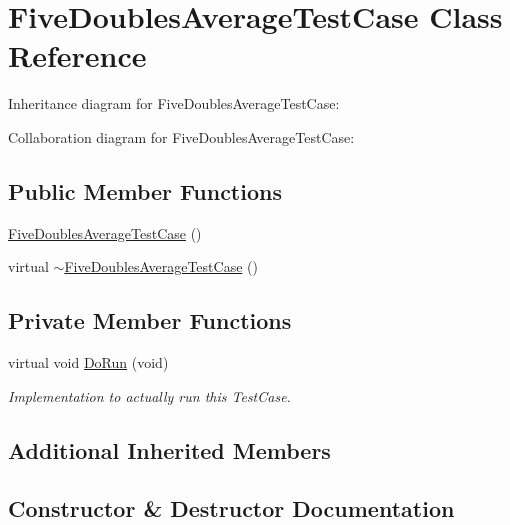 \hypertarget{classFiveDoublesAverageTestCase}{}\section{Five\+Doubles\+Average\+Test\+Case Class Reference}
\label{classFiveDoublesAverageTestCase}


Inheritance diagram for Five\+Doubles\+Average\+Test\+Case\+:


Collaboration diagram for Five\+Doubles\+Average\+Test\+Case\+:
\subsection*{Public Member Functions}
\begin{DoxyCompactItemize}
\item 
\hyperlink{classFiveDoublesAverageTestCase_ad6342b257bccc76b9caf83b6cefa512f}{Five\+Doubles\+Average\+Test\+Case} ()
\item 
virtual \hyperlink{classFiveDoublesAverageTestCase_aa266ba74634fcf9fa1fd96bf5904681e}{$\sim$\+Five\+Doubles\+Average\+Test\+Case} ()
\end{DoxyCompactItemize}
\subsection*{Private Member Functions}
\begin{DoxyCompactItemize}
\item 
virtual void \hyperlink{classFiveDoublesAverageTestCase_aacfcb4f28de8cd6cca19268e9695704d}{Do\+Run} (void)
\begin{DoxyCompactList}\small\item\em Implementation to actually run this Test\+Case. \end{DoxyCompactList}\end{DoxyCompactItemize}
\subsection*{Additional Inherited Members}


\subsection{Constructor \& Destructor Documentation}
